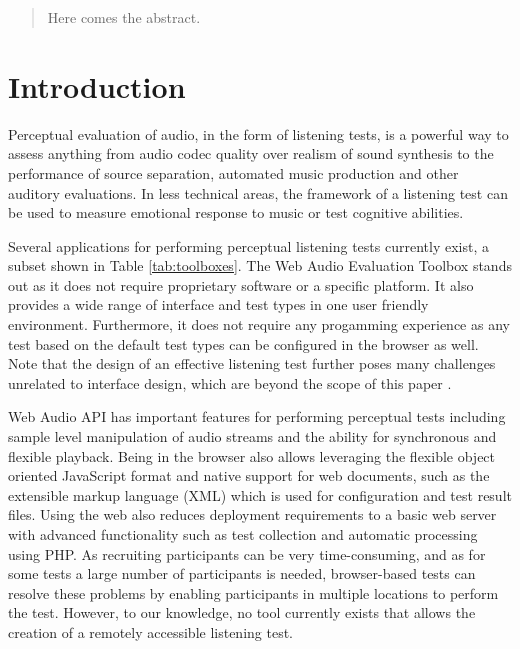 \documentclass{sig-alternate}
\begin{document}
\maketitle
\begin{abstract}
Here comes the abstract. 
\end{abstract}


\section{Introduction}

	Perceptual evaluation of audio, in the form of listening tests, is a powerful way to assess anything from audio codec quality over realism of sound synthesis to the performance of source separation, automated music production and other auditory evaluations.
	In less technical areas, the framework of a listening test can be used to measure emotional response to music or test cognitive abilities. 


	Several applications for performing perceptual listening tests currently exist, a subset shown in Table \ref{tab:toolboxes}. The Web Audio Evaluation Toolbox stands out as it does not require proprietary software or a specific platform. It also provides a wide range of interface and test types in one user friendly environment. Furthermore, it does not require any progamming experience as any test based on the default test types can be configured in the browser as well. Note that the design of an effective listening test further poses many challenges unrelated to interface design, which are beyond the scope of this paper \cite{bech}. 

	Web Audio API has important features for performing perceptual tests including sample level manipulation of audio streams \cite{schoeffler2015mushra} and the ability for synchronous and flexible playback. Being in the browser also allows leveraging the flexible object oriented JavaScript format and native support for web documents, such as the extensible markup language (XML) which is used for configuration and test result files. Using the web also reduces deployment requirements to a basic web server with advanced functionality such as test collection and automatic processing using PHP. As recruiting participants can be very time-consuming, and as for some tests a large number of participants is needed, browser-based tests \cite{schoeffler2015mushra} can resolve these problems by enabling participants in multiple locations to perform the test. However, to our knowledge, no tool currently exists that allows the creation of a remotely accessible listening test. 
\end{document}

